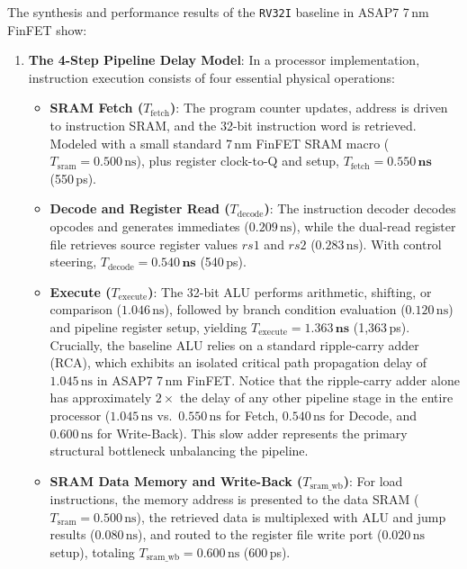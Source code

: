 The synthesis and performance results of the \texttt{RV32I} baseline in ASAP7 7\,nm FinFET show:
\begin{enumerate}
    \item \textbf{The 4-Step Pipeline Delay Model}:
    In a processor implementation, instruction execution consists of four essential physical operations:
    \begin{itemize}
        \item \textbf{SRAM Fetch ($T_{\text{fetch}}$)}: The program counter updates, address is driven to instruction SRAM, and the 32-bit instruction word is retrieved. Modeled with a small standard 7\,nm FinFET SRAM macro ($T_{\text{sram}} = 0.500\,\text{ns}$), plus register clock-to-Q and setup, $T_{\text{fetch}} = \mathbf{0.550\,\text{ns}}$ (550\,ps).
        
        \item \textbf{Decode and Register Read ($T_{\text{decode}}$)}: The instruction decoder decodes opcodes and generates immediates ($0.209\,\text{ns}$), while the dual-read register file retrieves source register values $rs1$ and $rs2$ ($0.283\,\text{ns}$). With control steering, $T_{\text{decode}} = \mathbf{0.540\,\text{ns}}$ (540\,ps).
        
        \item \textbf{Execute ($T_{\text{execute}}$)}: The 32-bit ALU performs arithmetic, shifting, or comparison ($1.046\,\text{ns}$), followed by branch condition evaluation ($0.120\,\text{ns}$) and pipeline register setup, yielding $T_{\text{execute}} = \mathbf{1.363\,\text{ns}}$ (1,363\,ps). Crucially, the baseline ALU relies on a standard ripple-carry adder (RCA), which exhibits an isolated critical path propagation delay of $1.045\,\text{ns}$ in ASAP7 7\,nm FinFET. Notice that the ripple-carry adder alone has approximately $2\times$ the delay of any other pipeline stage in the entire processor ($1.045\,\text{ns}$ vs.\ $0.550\,\text{ns}$ for Fetch, $0.540\,\text{ns}$ for Decode, and $0.600\,\text{ns}$ for Write-Back). This slow adder represents the primary structural bottleneck unbalancing the pipeline.
        
        \item \textbf{SRAM Data Memory and Write-Back ($T_{\text{sram\_wb}}$)}: For load instructions, the memory address is presented to the data SRAM ($T_{\text{sram}} = 0.500\,\text{ns}$), the retrieved data is multiplexed with ALU and jump results ($0.080\,\text{ns}$), and routed to the register file write port ($0.020\,\text{ns}$ setup), totaling $T_{\text{sram\_wb}} = 0.600\,\text{ns}$ (600\,ps).
    \end{itemize}
    

\end{enumerate}
